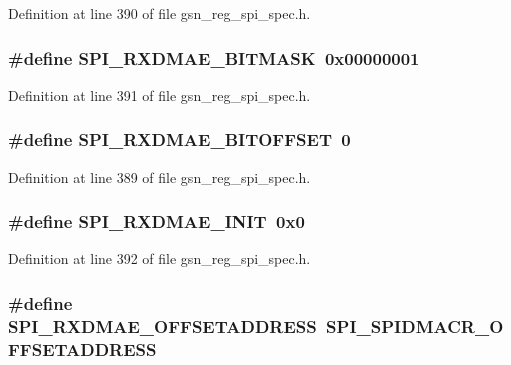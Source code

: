 Definition at line 390 of file gsn\_\-reg\_\-spi\_\-spec.h.

\hypertarget{a00573_ab26e5074c50fb60c7a15bf63a549956f}{
\subsubsection[{SPI\_\-RXDMAE\_\-BITMASK}]{\setlength{\rightskip}{0pt plus 5cm}\#define SPI\_\-RXDMAE\_\-BITMASK~0x00000001}}
\label{a00573_ab26e5074c50fb60c7a15bf63a549956f}


Definition at line 391 of file gsn\_\-reg\_\-spi\_\-spec.h.

\hypertarget{a00573_a6cd5ac85e28ff2fa0511ce564ed4dc6e}{
\subsubsection[{SPI\_\-RXDMAE\_\-BITOFFSET}]{\setlength{\rightskip}{0pt plus 5cm}\#define SPI\_\-RXDMAE\_\-BITOFFSET~0}}
\label{a00573_a6cd5ac85e28ff2fa0511ce564ed4dc6e}


Definition at line 389 of file gsn\_\-reg\_\-spi\_\-spec.h.

\hypertarget{a00573_a52da47e7cb15211b390c39f07f49f015}{
\subsubsection[{SPI\_\-RXDMAE\_\-INIT}]{\setlength{\rightskip}{0pt plus 5cm}\#define SPI\_\-RXDMAE\_\-INIT~0x0}}
\label{a00573_a52da47e7cb15211b390c39f07f49f015}


Definition at line 392 of file gsn\_\-reg\_\-spi\_\-spec.h.

\hypertarget{a00573_a5aa989278ecd25795173121768aca2c7}{
\subsubsection[{SPI\_\-RXDMAE\_\-OFFSETADDRESS}]{\setlength{\rightskip}{0pt plus 5cm}\#define SPI\_\-RXDMAE\_\-OFFSETADDRESS~SPI\_\-SPIDMACR\_\-OFFSETADDRESS}}
\label{a00573_a5aa989278ecd25795173121768aca2c7}



